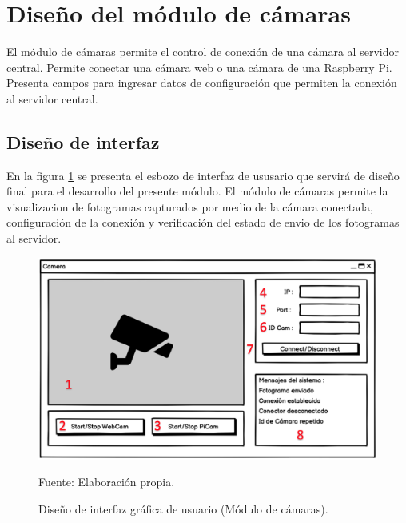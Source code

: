 \section{Diseño del módulo de cámaras}
El módulo de cámaras permite el control de conexión de una cámara al servidor central. Permite conectar una cámara web o una cámara de  una Raspberry Pi. Presenta campos para ingresar datos de configuración que permiten la conexión al servidor central.\\

\subsection{Diseño de interfaz}
En la figura \ref{fig:cam_user_interface} se presenta el esbozo de interfaz de ususario que servirá de diseño final para el desarrollo del presente módulo. El módulo de cámaras permite la visualizacion de fotogramas capturados por medio de la cámara conectada, configuración de la conexión y verificación del estado de envio de los fotogramas al servidor.

\begin{figure}[H]
    \begin{center}
        \includegraphics[width=13cm]{img/capitulo_4/camera_interface.png}
    \end{center}
    \begin{center}
        \caption{Diseño de interfaz gráfica de usuario (Módulo de cámaras).}
        Fuente: Elaboración propia.
        \label{fig:cam_user_interface}
    \end{center}
\end{figure}

